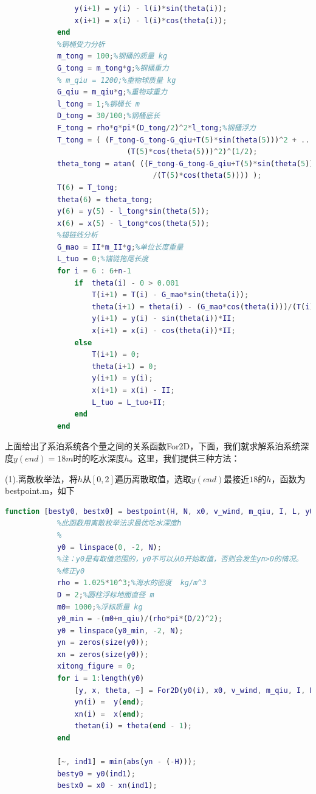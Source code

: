 \documentclass[UTF8]{ctexbook}
\theoremstyle{nonumberplain}
\begin{document}
\begin{lstlisting}[language = Matlab]
                %钢管i的坐标（xi,yi）
                y(i+1) = y(i) - l(i)*sin(theta(i));
                x(i+1) = x(i) - l(i)*cos(theta(i));
            end
            %钢桶受力分析
            m_tong = 100;%钢桶的质量 kg
            G_tong = m_tong*g;%钢桶重力
            % m_qiu = 1200;%重物球质量 kg
            G_qiu = m_qiu*g;%重物球重力
            l_tong = 1;%钢桶长 m
            D_tong = 30/100;%钢桶底长
            F_tong = rho*g*pi*(D_tong/2)^2*l_tong;%钢桶浮力
            T_tong = ( (F_tong-G_tong-G_qiu+T(5)*sin(theta(5)))^2 + ...
                            (T(5)*cos(theta(5)))^2)^(1/2);
            theta_tong = atan( ((F_tong-G_tong-G_qiu+T(5)*sin(theta(5)))...
                                  /(T(5)*cos(theta(5)))) );
            T(6) = T_tong;
            theta(6) = theta_tong;
            y(6) = y(5) - l_tong*sin(theta(5));
            x(6) = x(5) - l_tong*cos(theta(5));
            %锚链线分析
            G_mao = II*m_II*g;%单位长度重量
            L_tuo = 0;%锚链拖尾长度
            for i = 6 : 6+n-1
                if  theta(i) - 0 > 0.001
                    T(i+1) = T(i) - G_mao*sin(theta(i));
                    theta(i+1) = theta(i) - (G_mao*cos(theta(i)))/(T(i)-G_mao*sin(theta(i)));
                    y(i+1) = y(i) - sin(theta(i))*II;
                    x(i+1) = x(i) - cos(theta(i))*II;
                else
                    T(i+1) = 0;
                    theta(i+1) = 0;
                    y(i+1) = y(i);
                    x(i+1) = x(i) - II;
                    L_tuo = L_tuo+II;
                end
            end
            \end{lstlisting}
            \par
            上面给出了系泊系统各个量之间的关系函数For2D，下面，我们就求解系泊系统深度$y(end)=18m$时的吃水深度$h$。这里，我们提供三种方法：
            \par
            (1).离散枚举法，将$h$从$[0,2]$遍历离散取值，选取$y(end)$最接近$18$的$h$，函数为bestpoint.m，如下
            \begin{lstlisting}[language = Matlab]
            function [besty0, bestx0] = bestpoint(H, N, x0, v_wind, m_qiu, I, L, y0_yn_figure)
            %此函数用离散枚举法求最优吃水深度h
            %
            y0 = linspace(0, -2, N);
            %注：y0是有取值范围的，y0不可以从0开始取值，否则会发生yn>0的情况。
            %修正y0
            rho = 1.025*10^3;%海水的密度  kg/m^3
            D = 2;%圆柱浮标地面直径 m
            m0= 1000;%浮标质量 kg
            y0_min = -(m0+m_qiu)/(rho*pi*(D/2)^2);
            y0 = linspace(y0_min, -2, N);
            yn = zeros(size(y0));
            xn = zeros(size(y0));
            xitong_figure = 0;
            for i = 1:length(y0)
                [y, x, theta, ~] = For2D(y0(i), x0, v_wind, m_qiu, I, L, xitong_figure);
                yn(i) =  y(end);
                xn(i) =  x(end);
                thetan(i) = theta(end - 1);
            end

            [~, ind1] = min(abs(yn - (-H)));
            besty0 = y0(ind1);
            bestx0 = x0 - xn(ind1);
            \end{lstlisting}
\end{document}
